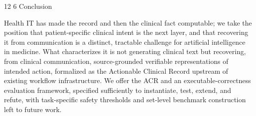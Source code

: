 \documentclass[3p,twocolumn]{elsarticle}
\makeatletter
\renewcommand\section{\@startsection{section}{1}{\z@}%
           {12\p@ \@plus 4\p@ \@minus 4\p@}%
           {6\p@ \@plus 4\p@ \@minus 3\p@}%
           {\normalsize\bfseries\boldmath}}
\makeatother
\begin{document}
\section{Conclusion}\label{conclusion}

Health IT has made the record and then the clinical fact computable; we take the position that patient-specific clinical intent is the next layer, and that recovering it from communication is a distinct, tractable challenge for artificial intelligence in medicine. What characterizes it is not generating clinical text but recovering, from clinical communication, source-grounded verifiable representations of intended action, formalized as the Actionable Clinical Record upstream of existing workflow infrastructure. We offer the ACR and an executable-correctness evaluation framework, specified sufficiently to instantiate, test, extend, and refute, with task-specific safety thresholds and set-level benchmark construction left to future work.
\end{document}
